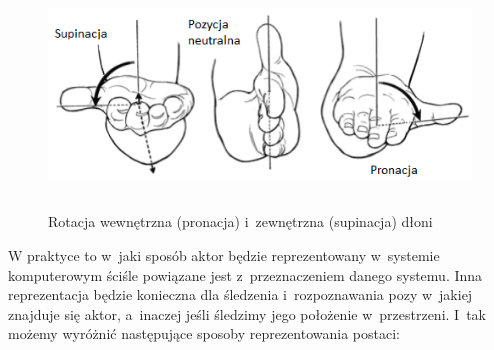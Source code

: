 \begin{savenotes}
	\begin{figure}[!htb]
		\centering	
		\includegraphics[height=6cm]{images/Wrist_joint_rotation.png}
		\caption{Rotacja wewnętrzna (pronacja) i~zewnętrzna (supinacja) dłoni}	
		\label{fig:literature:wristRotation}
	\end{figure}
\end{savenotes}
															
W praktyce to w~jaki sposób aktor będzie reprezentowany w~systemie komputerowym ściśle powiązane jest z~przeznaczeniem danego systemu. Inna reprezentacja będzie konieczna dla śledzenia i~rozpoznawania pozy w~jakiej znajduje się aktor, a~inaczej jeśli śledzimy jego położenie w~przestrzeni. I~tak możemy wyróżnić następujące sposoby reprezentowania postaci:
																
